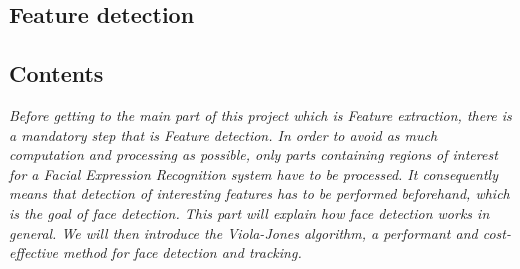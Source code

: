   \begin{titlepage}
    \vspace*{\fill}
      \part{Feature detection}
    \vspace*{\fill}
  \end{titlepage}
  
\startcontents[parts]

\chapter*{Contents}

\textit{Before getting to the main part of this project which is Feature extraction, there is a mandatory step that is Feature detection. In order to avoid as much computation and processing as possible, only parts containing regions of interest for a Facial Expression Recognition system have to be processed. It consequently means that detection of interesting features has to be performed beforehand, which is the goal of face detection. This part will explain how face detection works in general. We will then introduce the Viola-Jones algorithm, a performant and cost-effective method for face detection and tracking.}

\vspace{\baselineskip}


\pagebreak


\newpage


\stopcontents[parts]

